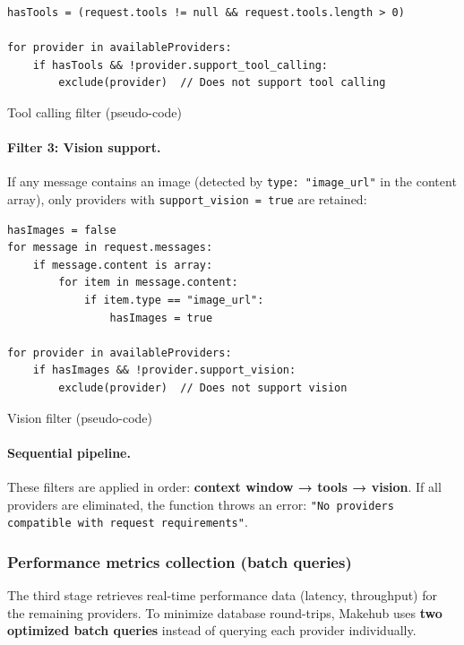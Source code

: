 \documentclass[english]{article}
\begin{document}
\begin{listing}[H]
\begin{verbatim}
hasTools = (request.tools != null && request.tools.length > 0)

for provider in availableProviders:
    if hasTools && !provider.support_tool_calling:
        exclude(provider)  // Does not support tool calling
\end{verbatim}
\caption{Tool calling filter (pseudo-code)}
\end{listing}

\paragraph{Filter 3: Vision support.}

If any message contains an image (detected by \texttt{type: "image\_url"} in the content array), only providers with \texttt{support\_vision = true} are retained:

\begin{listing}[H]
\begin{verbatim}
hasImages = false
for message in request.messages:
    if message.content is array:
        for item in message.content:
            if item.type == "image_url":
                hasImages = true

for provider in availableProviders:
    if hasImages && !provider.support_vision:
        exclude(provider)  // Does not support vision
\end{verbatim}
\caption{Vision filter (pseudo-code)}
\end{listing}

\paragraph{Sequential pipeline.}

These filters are applied in order: \textbf{context window → tools → vision}. If all providers are eliminated, the function throws an error: \texttt{"No providers compatible with request requirements"}.

\subsubsection{Performance metrics collection (batch queries)}

The third stage retrieves real-time performance data (latency, throughput) for the remaining providers. To minimize database round-trips, Makehub uses \textbf{two optimized batch queries} instead of querying each provider individually.
\end{document}
